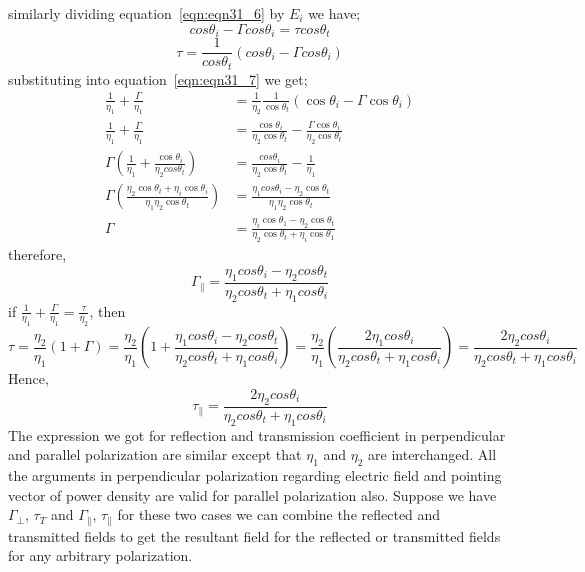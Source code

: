 similarly dividing  equation~\ref{eqn:eqn31_6} by $E_{i}$ we have;
\begin{equation}
cos\theta_{i} - \Gamma cos\theta_{i} = \tau cos\theta_{t}
\end{equation}
\begin{equation*}
\tau = \frac{1}{cos\theta_{t}} (cos\theta_{i} - \Gamma cos\theta_{i})
\end{equation*}
substituting into equation~\ref{eqn:eqn31_7} we get;
\begin{align*}
\frac{1}{\eta_{1}} + \frac{\Gamma}{\eta_{1}} &= \frac{1}{\eta_{2}} \frac{1}{\cos\theta_{t}} (\cos\theta_{i} - \Gamma \cos\theta_{i})\\
\frac{1}{\eta_{1}} + \frac{\Gamma}{\eta_{1}} &= \frac{\cos \theta_{i}}{\eta_{2}\cos \theta_{t}} - \frac{\Gamma \cos\theta_{i}}{\eta_{2} \cos\theta_{t}}\\
\Gamma \left(\frac{1}{\eta_{1}} + \frac{\cos\theta_{i}}{\eta_{2} cos\theta_{t}}\right) &= \frac{cos\theta_{i}}{\eta_{2} \cos\theta_{t}} - \frac{1}{\eta_{1}}\\
\Gamma \left(\frac{\eta_{2} \cos\theta_{t} + \eta_{i} \cos\theta_{i}}{\eta_{1} \eta_{2} \cos\theta_{t}}\right) &= \frac{\eta_{1} cos\theta_{i} - \eta_{2} \cos\theta_{t}}{\eta_{1} \eta_{2} \cos\theta_{t}}\\
\Gamma &= \frac{\eta_{i} \cos\theta_{1} - \eta_{2} \cos\theta_{t}}{\eta_{2} \cos\theta_{t} + \eta_{i} \cos\theta_{1}}
\end{align*}
therefore,
\begin{dmath}
\Gamma_{\parallel} = \frac{\eta_{1} cos\theta_{i} - \eta_{2} cos\theta_{t}}{\eta_{2} cos\theta_{t} + \eta_{1} cos\theta_{i}}
\end{dmath}
if $\frac{1}{\eta_{1}} + \frac{\Gamma}{\eta_{1}} = \frac{\tau}{\eta_{2}}$,  then 
\begin{dmath*}
\tau = \frac{\eta_{2}}{\eta_{1}} (1 + \Gamma)
= \frac{\eta_{2}}{\eta_{1}} (1 + \frac{\eta_{1} cos\theta_{i} - \eta_{2} cos\theta_{t}}{\eta_{2} cos\theta_{t} + \eta_{1} cos\theta_{i}})
= \frac{\eta_{2}}{\eta_{1}} (\frac{2\eta_{1} cos\theta_{i}}{\eta_{2} cos\theta_{t} + \eta_{1} cos\theta_{i}})
= \frac{2 \eta_{2} cos\theta_{i}}{\eta_{2} cos\theta_{t} + \eta_{1} cos\theta_{i}}
\end{dmath*}
Hence,
\begin{equation}
\tau_{\parallel} = \frac{2\eta_{2} cos\theta_{i} }{\eta_{2} cos\theta_{t} + \eta_{1} cos\theta_{i}} 
\end{equation}
The expression we got for reflection and transmission coefficient in perpendicular and parallel polarization are similar except that $\eta_{1}$ and $\eta_{2}$ are interchanged. All the arguments in perpendicular polarization regarding electric field and pointing vector of power density are valid for parallel polarization also. Suppose we have $\Gamma_{\perp}$, $\tau_{T}$ and $\Gamma_{\parallel}$, $\tau_{\parallel}$ for these two cases we can combine the reflected and transmitted fields to get the resultant field for the reflected or transmitted fields for any arbitrary polarization.

